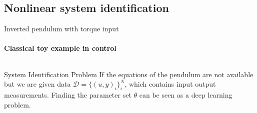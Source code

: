 \documentclass[8pt, t,
aspectratio=169,%
]{beamer}
\begin{document}
\subsection{Nonlinear system identification}
\begin{frame}{Inverted pendulum with torque input}
    \framesubtitle{Classical toy example in control}
    \begin{columns}[]
        \begin{block}{System Identification Problem}
            If the equations of the pendulum are not available but we are given data $\mathcal{D} = \{(u,y)_i\}_i^N$, which contains input output measurements. Finding the parameter set $\theta$ can be seen as a deep learning problem.

\end{block}
\end{columns}
\end{frame}
\end{document}

